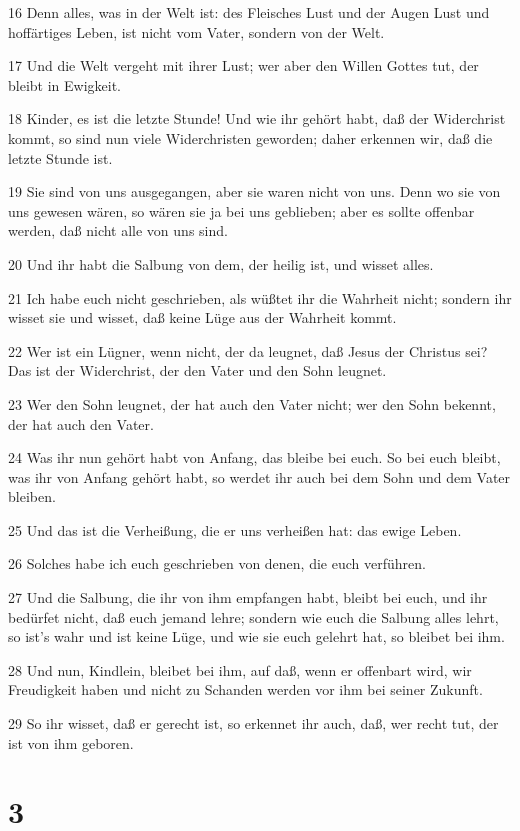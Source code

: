 \par 16 Denn alles, was in der Welt ist: des Fleisches Lust und der Augen Lust und hoffärtiges Leben, ist nicht vom Vater, sondern von der Welt.
\par 17 Und die Welt vergeht mit ihrer Lust; wer aber den Willen Gottes tut, der bleibt in Ewigkeit.
\par 18 Kinder, es ist die letzte Stunde! Und wie ihr gehört habt, daß der Widerchrist kommt, so sind nun viele Widerchristen geworden; daher erkennen wir, daß die letzte Stunde ist.
\par 19 Sie sind von uns ausgegangen, aber sie waren nicht von uns. Denn wo sie von uns gewesen wären, so wären sie ja bei uns geblieben; aber es sollte offenbar werden, daß nicht alle von uns sind.
\par 20 Und ihr habt die Salbung von dem, der heilig ist, und wisset alles.
\par 21 Ich habe euch nicht geschrieben, als wüßtet ihr die Wahrheit nicht; sondern ihr wisset sie und wisset, daß keine Lüge aus der Wahrheit kommt.
\par 22 Wer ist ein Lügner, wenn nicht, der da leugnet, daß Jesus der Christus sei? Das ist der Widerchrist, der den Vater und den Sohn leugnet.
\par 23 Wer den Sohn leugnet, der hat auch den Vater nicht; wer den Sohn bekennt, der hat auch den Vater.
\par 24 Was ihr nun gehört habt von Anfang, das bleibe bei euch. So bei euch bleibt, was ihr von Anfang gehört habt, so werdet ihr auch bei dem Sohn und dem Vater bleiben.
\par 25 Und das ist die Verheißung, die er uns verheißen hat: das ewige Leben.
\par 26 Solches habe ich euch geschrieben von denen, die euch verführen.
\par 27 Und die Salbung, die ihr von ihm empfangen habt, bleibt bei euch, und ihr bedürfet nicht, daß euch jemand lehre; sondern wie euch die Salbung alles lehrt, so ist's wahr und ist keine Lüge, und wie sie euch gelehrt hat, so bleibet bei ihm.
\par 28 Und nun, Kindlein, bleibet bei ihm, auf daß, wenn er offenbart wird, wir Freudigkeit haben und nicht zu Schanden werden vor ihm bei seiner Zukunft.
\par 29 So ihr wisset, daß er gerecht ist, so erkennet ihr auch, daß, wer recht tut, der ist von ihm geboren.

\chapter{3}

